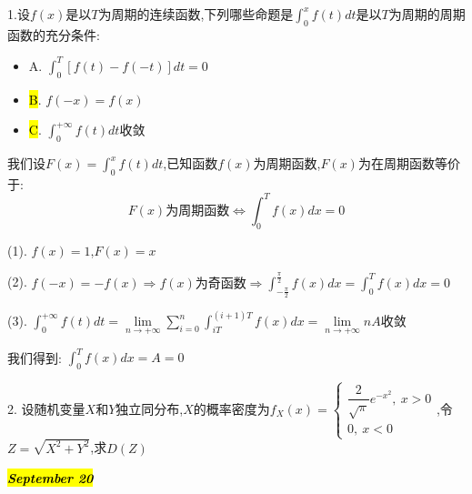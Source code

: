 1.设$f(x)$是以$T$为周期的连续函数,下列哪些命题是$\int_{0}^{x}f(t)dt$是以$T$为周期的周期函数的充分条件:  
\begin{itemize}
	\item A. $\int_{0}^{T}\left[ f(t)-f(-t)\right]dt=0$
	\item \hl{B}. $f(-x)=f(x)$
	\item \hl{C}. $\int_{0}^{+\infty}f(t)dt$收敛
\end{itemize}
\begin{solution}

	我们设$F(x)=\int_{0}^{x}f(t)dt$,已知函数$f(x)$为周期函数,$F(x)$为在周期函数等价于:  
	$$F(x)\text{为周期函数}\Leftrightarrow \int_{0}^{T}f(x)dx=0$$
	
	(1). $f(x)=1$,$F(x)=x$
	
	(2). $f(-x)=-f(x)\Rightarrow f(x)\text{为奇函数}\Rightarrow \int_{-\frac{\pi}{2}}^{\frac{\pi}{2}}f(x)dx=\int_{0}^{T}f(x)dx=0$
	
	(3). $\int_{0}^{+\infty}f(t)dt=\lim\limits_{n\rightarrow+\infty}\sum\limits_{i=0}^{n}\int_{iT}^{(i+1)T}f(x)dx=\lim\limits_{n\rightarrow+\infty}nA\text{收敛}$
	
	我们得到:  $\int_{0}^{T}f(x)dx=A=0$
\end{solution}

2. 设随机变量$X$和$Y$独立同分布,$X$的概率密度为$f_{X}(x)=\left\lbrace
\begin{array}{l}
	\dfrac{2}{\sqrt{\pi}}e^{-x^2},\ x>0\\
	0,\ x<0
\end{array}
\right. $,令$Z=\sqrt{X^2+Y^2}$,求$D(Z)$
\begin{solution}
	
\end{solution}

\hl{\textbf{\textit{September 20}}}


